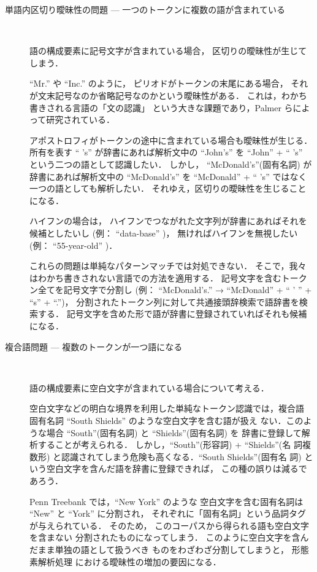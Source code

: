 \begin{description}
\item[単語内区切り曖昧性の問題 --- 一つのトークンに複数の語が含まれている] 
  ~

  語の構成要素に記号文字が含まれている場合，
  区切りの曖昧性が生じてしまう．

  ``Mr.'' や ``Inc.'' のように，
  ピリオドがトークンの末尾にある場合，
  それが文末記号なのか省略記号なのかという曖昧性がある．
  これは，わかち書きされる言語の「文の認識」
  という大きな課題であり，Palmer ら\cite{Palmer97}によって研究されている．

  アポストロフィがトークンの途中に含まれている場合も曖昧性が生じる．
  所有を表す `` 's'' が辞書にあれば解析文中の 
  ``John's'' を
  ``John'' + `` 's'' という二つの語として認識したい．
  しかし，
  ``McDonald's''(固有名詞) が辞書にあれば解析文中の
  ``McDonald's'' を ``McDonald'' + `` 's'' ではなく
  一つの語としても解析したい．
  それゆえ，区切りの曖昧性を生じることになる．

  ハイフンの場合は，
  ハイフンでつながれた文字列が辞書にあればそれを候補としたいし
  (例： ``data-base'' )，
  無ければハイフンを無視したい(例： ``55-year-old'' )．




  これらの問題は単純なパターンマッチでは対処できない．
  そこで，我々はわかち書きされない言語での方法を適用する．
  記号文字を含むトークン全てを記号文字で分割し
  (例： ``McDonald's.''  →  ``McDonald'' + `` ' '' + ``s'' + ``.'')，
  分割されたトークン列に対して共通接頭辞検索で語辞書を検索する．
  記号文字を含めた形で語が辞書に登録されていればそれも候補になる．

  

\item[複合語問題 --- 複数のトークンが一つ語になる] ~

  語の構成要素に空白文字が含まれている場合について考える．

  空白文字などの明白な境界を利用した単純なトークン認識では，複合語
  固有名詞 ``South Shields'' のような空白文字を含む語が扱え
  ない．このような場合 ``South''(固有名詞) と ``Shields''(固有名詞) を
  辞書に登録して解析することが考えられる．
  しかし，``South''(形容詞) + ``Shields''(名
  詞複数形) と認識されてしまう危険も高くなる．``South Shields''(固有名
  詞) という空白文字を含んだ語を辞書に登録できれば，
  この種の誤りは減るであろう．
  

  Penn Treebank\cite{PennTreebank90} では，``New York'' のような
  空白文字を含む固有名詞は ``New'' と ``York'' に分割され，
  それぞれに「固有名詞」という品詞タグが与えられている．
  そのため，
  このコーパスから得られる語も空白文字を含まない
  分割されたものになってしまう．
  このように空白文字を含んだまま単独の語として扱うべき
  ものをわざわざ分割してしまうと，
  形態素解析処理
  における曖昧性の増加の要因になる．



\end{description}
